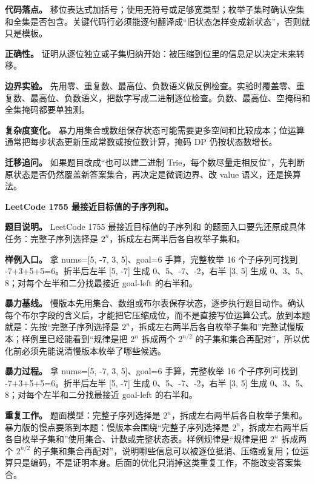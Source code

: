 \textbf{代码落点。} 移位表达式加括号；使用无符号或足够宽类型；枚举子集时确认空集和全集是否包含。关键代码行必须能逐句翻译成“旧状态怎样变成新状态”，否则就只是模板。

\textbf{正确性。} 证明从逐位独立或子集归纳开始：被压缩到位里的信息足以决定未来转移。

\textbf{边界实验。} 先用零、重复数、最高位、负数语义做反例检查。实验时覆盖零、重复数、最高位、负数语义，把数字写成二进制逐位检查。负数、最高位、空掩码和全集掩码都要单独测。

\textbf{复杂度变化。} 暴力用集合或数组保存状态可能需要更多空间和比较成本；位运算通常把每步状态更新压成常数或按位数计算，掩码 DP 仍按状态数增长。

\textbf{迁移追问。} 如果题目改成“也可以建二进制 Trie，每个数尽量走相反位”，先判断原状态是否仍然覆盖新答案集合，再决定是微调边界、改 value 语义，还是换算法。

\noindent\textbf{LeetCode 1755 最接近目标值的子序列和。}

\textbf{题目说明。} LeetCode 1755 最接近目标值的子序列和 的题面入口要先还原成具体任务：完整子序列选择是 \ensuremath{2^{n}}，拆成左右两半后各自枚举子集和。

\textbf{样例入口。} 拿 nums=[5, -7, 3, 5]、goal=6 手算，完整枚举 16 个子序列可找到 -7+3+5+5=6。折半后左半 [5, -7] 生成 0、5、-7、-2，右半 [3, 5] 生成 0、3、5、8；对每个左半和二分找最接近 goal-left 的右半和。

\textbf{暴力基线。} 慢版本先用集合、数组或布尔表保存状态，逐步执行题目动作。确认每个布尔字段的含义后，才能把它压缩成位，而不是直接写位运算公式。放到本题就是：先按“完整子序列选择是 \ensuremath{2^{n}}，拆成左右两半后各自枚举子集和”完整试慢版本；样例里已经能看到“规律是把 \ensuremath{2^{n}} 拆成两个 \ensuremath{2^{n/2}} 的子集和集合再配对”，所以优化前必须先能说清慢版本枚举了哪些候选。

\textbf{暴力过程。} 拿 nums=[5, -7, 3, 5]、goal=6 手算，完整枚举 16 个子序列可找到 -7+3+5+5=6。折半后左半 [5, -7] 生成 0、5、-7、-2，右半 [3, 5] 生成 0、3、5、8；对每个左半和二分找最接近 goal-left 的右半和。

\textbf{重复工作。} 题面模型：完整子序列选择是 \ensuremath{2^{n}}，拆成左右两半后各自枚举子集和。暴力版的慢点要落到本题：慢版本会围绕“完整子序列选择是 \ensuremath{2^{n}}，拆成左右两半后各自枚举子集和”使用集合、计数或完整状态表。样例规律是“规律是把 \ensuremath{2^{n}} 拆成两个 \ensuremath{2^{n/2}} 的子集和集合再配对”，说明哪些信息可以被逐位抵消、压缩或复用；位运算只是编码，不是证明本身。后面的优化只消掉这类重复工作，不能改变答案集合。

